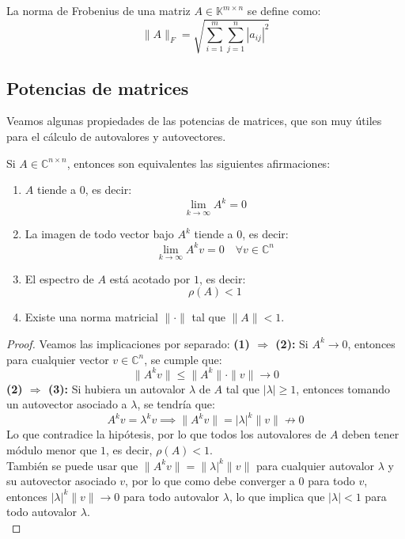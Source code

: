 \begin{definición}
    La norma de Frobenius de una matriz $ A \in \mathbb{K}^{m \times n} $ se define como:
    \[
        \|A\|_F = \sqrt{\sum_{i=1}^{m} \sum_{j=1}^{n} |a_{ij}|^2}
    \]
\end{definición}

\subsection{Potencias de matrices}

Veamos algunas propiedades de las potencias de matrices, que son muy útiles para el cálculo de autovalores y autovectores.

\begin{teorema}
    Si $ A \in \mathbb{C}^{n \times n} $, entonces son equivalentes las siguientes afirmaciones:
    \begin{enumerate}
        \item $A$ tiende a $0$, es decir:
        \[
            \lim_{k \to \infty} A^k = 0
        \]
        \item La imagen de todo vector bajo $A^k$ tiende a $0$, es decir:
        \[
            \lim_{k \to \infty} A^k v = 0 \quad \forall v \in \mathbb{C}^n
        \]
        \item El espectro de $A$ está acotado por $1$, es decir:
        \[
            \rho(A) < 1
        \]
        \item Existe una norma matricial $ \|\cdot\| $ tal que $ \|A\| < 1 $.
    \end{enumerate}
\end{teorema}

\begin{proof}
    Veamos las implicaciones por separado:
    \textbf{(1) $ \Rightarrow $ (2):} Si $ A^k \to 0 $, entonces para cualquier vector $ v \in \mathbb{C}^n $, se cumple que:
    \[
        \| A^k v\| \leq \|A^k\| \cdot \|v\| \to 0
    \]
    \textbf{(2) $ \Rightarrow $ (3):} Si hubiera un autovalor $ \lambda $ de $ A $ tal que $ |\lambda| \geq 1 $, entonces tomando un autovector asociado a $ \lambda $, se tendría que:
    \[
        A^k v = \lambda^k v \implies
        \| A^k v \| = |\lambda|^k \|v\| \not\to 0
    \]
    Lo que contradice la hipótesis, por lo que todos los autovalores de $ A $ deben tener módulo menor que $ 1 $, es decir, $ \rho(A) < 1 $.\\
    También se puede usar que $\| A^k v \| = \| \lambda |^k \|v\| $ para cualquier autovalor $ \lambda $ y su autovector asociado $ v $, por lo que como debe converger a $0$ para todo $v$, entonces $|\lambda|^k \|v\| \to 0$ para todo autovalor $ \lambda $, lo que implica que $|\lambda| < 1$ para todo autovalor $ \lambda $.\\
\end{proof}

